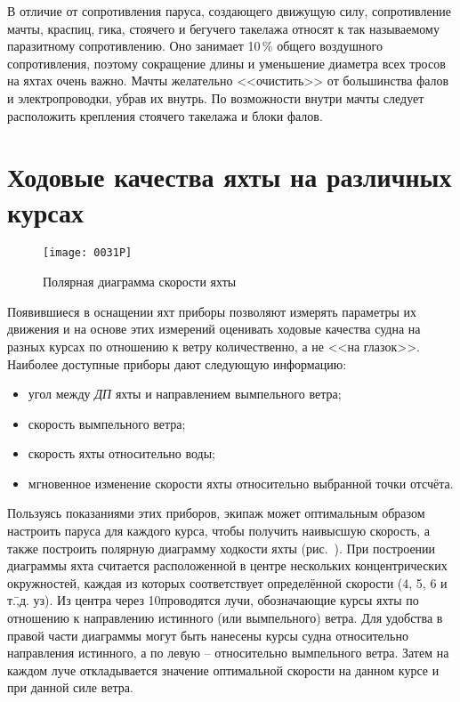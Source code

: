 В отличие от сопротивления паруса, создающего движущую силу,
сопротивление мачты, краспиц, гика, стоячего и бегучего такелажа
относят к так называемому паразитному
сопротивлению. Оно занимает 10\,\% общего воздушного сопротивления, поэтому сокращение длины и
уменьшение диаметра всех тросов на яхтах очень важно. Мачты желательно
<<очистить>> от большинства фалов и электропроводки, убрав их
внутрь. По возможности внутри мачты следует расположить крепления
стоячего такелажа и блоки фалов.

\section{Ходовые качества яхты на различных курсах}

\begin{figure}[htb]
  \centering
  \texttt{[image: 0031P]}
  \caption{Полярная диаграмма скорости яхты}
  \label{fig:31}
\end{figure}

Появившиеся в оснащении яхт приборы позволяют измерять параметры их
движения и на основе этих измерений оценивать ходовые качества судна
на разных курсах по отношению к ветру количественно, а не <<на
глазок>>. Наиболее доступные приборы дают следующую информацию:

\begin{itemize}
\item угол между \textit{ДП} яхты и направлением вымпельного ветра; 
\item скорость вымпельного ветра; 
\item скорость яхты относительно воды; 
\item мгновенное изменение скорости яхты относительно выбранной точки отсчёта. 
\end{itemize}

Пользуясь показаниями этих приборов, экипаж может оптимальным образом
настроить паруса для каждого курса, чтобы получить наивысшую скорость,
а также построить полярную диаграмму ходкости яхты
(рис.~). При построении диаграммы яхта считается расположенной
в центре нескольких концентрических окружностей, каждая из которых
соответствует определённой скорости (4, 5, 6 и т.\=,д. уз). Из центра
через 10\gr проводятся лучи, обозначающие курсы яхты по отношению к
направлению истинного (или вымпельного) ветра. Для удобства в правой
части диаграммы могут быть нанесены курсы судна относительно
направления истинного, а по левую \--- относительно вымпельного
ветра. Затем на каждом луче откладывается значение оптимальной
скорости на данном курсе и при данной силе ветра.

